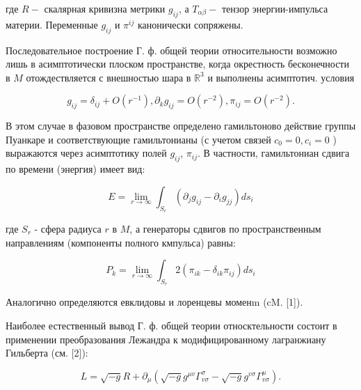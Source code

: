 \documentclass[10pt]{article}
\begin{document}
где $R-$ скалярная кривизна метрики $g_{i j}$, а $T_{\alpha \beta}-$ тензор энергии-импульса материи. Переменные $g_{i j}$ и $\pi^{i j}$ канонически сопряжены.



Последовательное построение Г. ф. общей теории относительности возможно лишь в асимптотически плоском пространстве, когда окрестность бесконечности в $M$ отождествляется с внешностью шара в $\mathbb{R}^{3}$ и выполнены асимптотич. условия



\[

g_{i j}=\delta_{i j}+O\left(r^{-1}\right), \partial_{k} g_{i j}=O\left(r^{-2}\right), \pi_{i j}=O\left(r^{-2}\right) .

\]



В этом случае в фазовом пространстве определено гамильтоново действие группы Пуанкаре и соответствующие гамильтонианы (с учетом связей $c_{0}=0, c_{i}=0$ ) выражаются через асимптотику полей $g_{i j}$, $\pi_{i j}$. В частности, гамильтониан сдвига по времени (энергия) имеет вид:



\[

E=\lim _{r \rightarrow \infty} \int_{S_{r}}\left(\partial_{j} g_{i j}-\partial_{i} g_{j j}\right) d s_{i}

\]



где $S_{r}$ - сфера радиуса $r$ в $M$, а генераторы сдвигов по пространственным направлениям (компоненты полного кмпульса) равны:



\[

P_{k}=\lim _{r \rightarrow \infty} \int_{S_{r}} 2\left(\pi_{i k}-\delta_{i k} \pi_{i j}\right) d s_{i}

\]



Аналогично определяются евклидовы и лоренцевы моменm (cM. [1]).



Наиболее естественный вывод Г. ф. общей теории относктельности состоит в применении преобразования Лежандра к модифицированному лагранжиану Гильберта (см. [2]):



\[

L=\sqrt{-g} R+\partial_{\mu}\left(\sqrt{-g} g^{\mu v} \Gamma_{v \sigma}^{\sigma}-\sqrt{-g} g^{v \sigma} \Gamma_{v \sigma}^{\mu}\right) .

\]
\end{document}
